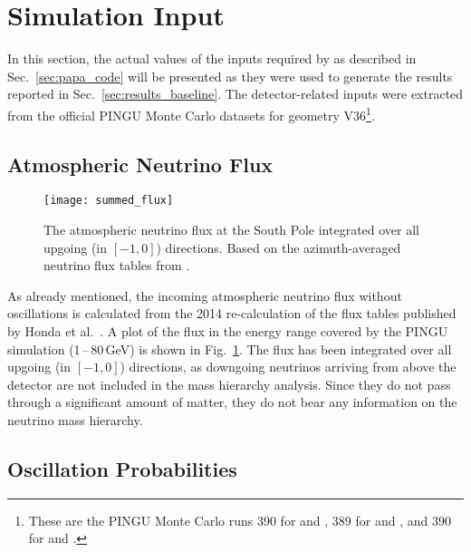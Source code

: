 \section{Simulation Input}
\label{sec:sim_input}

In this section, the actual values of the inputs required by \papa as described
in Sec.~\ref{sec:papa_code} will be presented as they were used to generate the
results reported in Sec.~\ref{sec:results_baseline}. The detector-related
inputs were extracted from the official PINGU Monte Carlo datasets for geometry
V36\footnote{These are the PINGU Monte Carlo runs 390 for \nue and \nuebar, 389
for \numu and \numubar, and 390 for \nutau and \nutaubar.}.

\subsection{Atmospheric Neutrino Flux}
\label{sec:input_flux}

\begin{figure}[htbp]
 \centering
 \texttt{[image: summed\_flux]}
 \caption{The atmospheric neutrino flux at the South Pole integrated over all
          upgoing (\coszen in $[-1,0]$) directions. Based on the
          azimuth-averaged neutrino flux tables from \cite{HondaSP}.}
\label{fig:summed_flux}
\end{figure}

\noindent
As already mentioned, the incoming atmospheric neutrino flux without
oscillations is calculated from the 2014 re-calculation of the flux tables
published by Honda et al.\ \cite{Honda, HondaSP}. A plot of the flux in the
energy range covered by the PINGU simulation (1\,--\,80\,GeV) is shown in
Fig.~\ref{fig:summed_flux}. The flux has been integrated over all upgoing
(\coszen in $[-1,0]$) directions, as downgoing neutrinos arriving from above
the detector are not included in the mass hierarchy analysis. Since they do not 
pass through a significant amount of matter, they do not bear any information on 
the neutrino mass hierarchy.

\subsection{Oscillation Probabilities}
\label{sec:input_osc}

